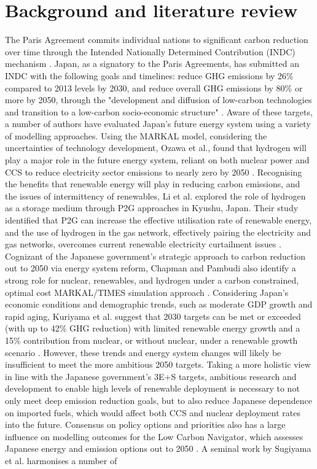 \section{Background and literature review} \label{litreview}
The Paris Agreement commits individual nations to significant carbon reduction over time through the Intended Nationally Determined Contribution (INDC) mechanism \cite{united_nations_framework_convention_on_climate_change_unfccc_submission_2015}. Japan, as a signatory to the Paris Agreements, has submitted an INDC with the following goals and timelines: reduce GHG emissions by 26\% compared to 2013 levels by 2030, and reduce overall GHG emissions by 80\% or more by 2050, through the "development and diffusion of low-carbon technologies and transition to a low-carbon socio-economic structure" \cite{united_nations_framework_convention_on_climate_change_unfccc_submission_2015}. Aware of these targets, a number of authors have evaluated Japan's future energy system using a variety of modelling approaches. Using the \gls{MARKAL} model, considering the uncertainties of technology development, Ozawa et al., found that hydrogen will play a major role in the future energy system, reliant on both nuclear power and \gls{CCS} to reduce electricity sector emissions to nearly zero by 2050 \cite{ozawa_hydrogen_2018}. Recognising the benefits that renewable energy will play in reducing carbon emissions, and the issues of intermittency of renewables, Li et al. explored the role of hydrogen as a storage medium through \gls{P2G} approaches in Kyushu, Japan. Their study identified that \gls{P2G} can increase the effective utilisation rate of renewable energy, and the use of hydrogen in the gas network, effectively pairing the electricity and gas networks, overcomes current renewable electricity curtailment issues \cite{li_potential_2019}. Cognizant of the Japanese government's strategic approach to carbon reduction out to 2050 via energy system reform, Chapman and Pambudi also identify a strong role for nuclear, renewables, and hydrogen under a carbon constrained, optimal cost MARKAL/TIMES simulation approach \cite{chapman_strategic_2018}. Considering Japan's economic conditions and demographic trends, such as moderate GDP growth and rapid aging, Kuriyama et al. suggest that 2030 targets can be met or exceeded (with up to 42\% GHG reduction) with limited renewable energy growth and a 15\% contribution from nuclear, or without nuclear, under a renewable growth scenario \cite{kuriyama_can_2019}. However, these trends and energy system changes will likely be insufficient to meet the more ambitious 2050 targets. Taking a more holistic view in line with the Japanese government's 3E+S targets, ambitious research and development to enable high levels of renewable deployment is necessary to not only meet deep emission reduction goals, but to also reduce Japanese dependence on imported fuels, which would affect both CCS and nuclear deployment rates into the future. Consensus on policy options and priorities also has a large influence on modelling outcomes for the Low Carbon Navigator, which assesses Japanese energy and emission options out to 2050 \cite{moinuddin_japan_2019}. A seminal work by Sugiyama et al. harmonises a number of 